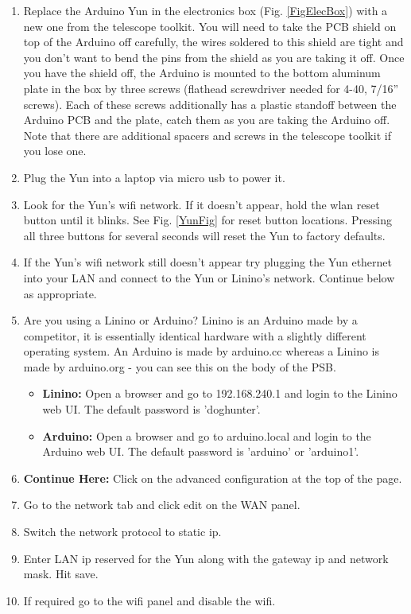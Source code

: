 \documentclass[11pt]{article}
\begin{document}
\label{secYun}
\begin{enumerate}
\item Replace the Arduino Yun in the electronics box (Fig. \ref{FigElecBox}) with a new one from the telescope toolkit.
	You will need to take the PCB shield on top of the Arduino off carefully, the wires soldered to this shield are tight and you don't want to bend the pins from the shield as you are taking it off.
	Once you have the shield off, the Arduino is mounted to the bottom aluminum plate in the box by three screws (flathead screwdriver needed for 4-40, 7/16'' screws).  
	Each of these screws additionally has a plastic standoff between the Arduino PCB and the plate, catch them as you are taking the Arduino off.
	Note that there are additional spacers and screws in the telescope toolkit if you lose one.
\item Plug the Yun into a laptop via micro usb to power it.
\item Look for the Yun's wifi network. If it doesn't appear, hold the wlan reset button until it blinks. 
	See Fig. \ref{YunFig} for reset button locations.
	Pressing all three buttons for several seconds will reset the Yun to factory defaults.
\item If the Yun's wifi network still doesn't appear try plugging the Yun ethernet into your LAN and connect to the Yun or Linino's network. Continue below as appropriate.\\
\item Are you using a Linino or Arduino?  Linino is an Arduino made by a competitor, it is essentially identical hardware with a slightly different operating system.
	An Arduino is made by arduino.cc whereas a Linino is made by arduino.org - you can see this on the body of the PSB.
        	\begin{itemize} 
		\item {\textbf{Linino:}} Open a browser and go to 192.168.240.1 and login to the Linino web UI. The default password is 'doghunter'.
		\item {\textbf{Arduino:}} Open a browser and go to arduino.local and login to the Arduino web UI. The default password is 'arduino' or 'arduino1'.
	\end{itemize}
\item \textbf{Continue Here:} Click on the advanced configuration at the top of the page.
\item Go to the network tab and click edit on the WAN panel.
\item Switch the network protocol to static ip.
\item Enter LAN ip reserved for the Yun along with the gateway ip and network mask. Hit save.
\item If required go to the wifi panel and disable the wifi.


\end{enumerate}
\end{document}
